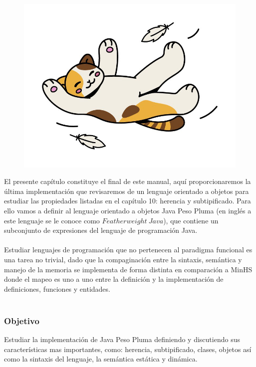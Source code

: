 
\begin{figure}[htbp]
    \centerline{\includegraphics[scale=.4]{assets/11_gatito_cayendo.jpg}}
\end{figure} 
\bigskip

El presente capítulo constituye el final de este manual, aquí proporcionaremos la última implementación que revisaremos de un lenguaje orientado a objetos para estudiar las propiedades listadas en el capítulo 10: herencia y subtipificado.
Para ello vamos a definir al lenguaje orientado a objetos \textsf{Java Peso Pluma} (en inglés a este lenguaje se le conoce como $Featherweight\ Java$), que contiene un subconjunto de expresiones del lenguaje de programación \textsf{Java}.\\\\
Estudiar lenguajes de programación que no pertenecen al paradigma funcional es una tarea no trivial, dado que la compaginación entre la sintaxis, semántica y manejo de la memoria se implementa de forma distinta en comparación a \textsf{MinHS} donde el mapeo es uno a uno entre la definición y la implementación de definiciones, funciones y entidades.\\\\

\subsubsection{Objetivo}
Estudiar la implementación de \textsf{Java Peso Pluma} definiendo y discutiendo sus características mas importantes, como: herencia, subtipificado, clases, objetos así como la sintaxis del lenguaje, la semántica estática y dinámica.\\

